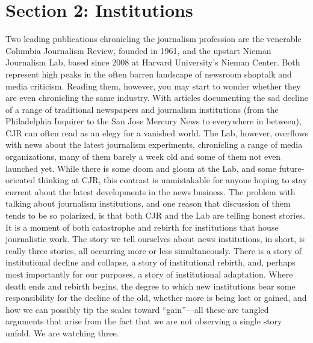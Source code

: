 \chapter{Section 2: Institutions}
Two leading publications chronicling the journalism profession are the venerable
Columbia Journalism Review, founded in 1961, and the upstart Nieman
Journalism Lab, based since 2008 at Harvard University’s Nieman Center. Both
represent high peaks in the often barren landscape of newsroom shoptalk and
media criticism. Reading them, however, you may start to wonder whether they
are even chronicling the same industry.
With articles documenting the sad decline of a range of traditional newspapers
and journalism institutions (from the Philadelphia Inquirer to the San Jose Mercury
News to everywhere in between), CJR can often read as an elegy for a vanished
world. The Lab, however, overflows with news about the latest journalism
experiments, chronicling a range of media organizations, many of them barely a
week old and some of them not even launched yet. While there is some doom
and gloom at the Lab, and some future-oriented thinking at CJR, this contrast
is unmistakable for anyone hoping to stay current about the latest developments
in the news business.
The problem with talking about journalism institutions, and one reason that discussion
of them tends to be so polarized, is that both CJR and the Lab are telling
honest stories. It is a moment of both catastrophe and rebirth for institutions that
house journalistic work.
The story we tell ourselves about news institutions, in short, is really three stories,
all occurring more or less simultaneously. There is a story of institutional decline
and collapse, a story of institutional rebirth, and, perhaps most importantly for our
purposes, a story of institutional adaptation. Where death ends and rebirth begins,
the degree to which new institutions bear some responsibility for the decline of
the old, whether more is being lost or gained, and how we can possibly tip the
scales toward ``gain''—all these are tangled arguments that arise from the fact that
we are not observing a single story unfold. We are watching three.

